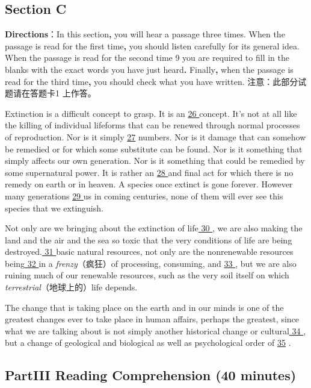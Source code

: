 \documentclass[UTF8,11pt]{ctexart}
\begin{document}
\subsection*{\textbf{Section C}}


\textbf{Directions}：In this section\textbf{,} you will hear a passage three times. When the passage is read for the first time\textbf{,} you should listen carefully for its general idea. When the passage is read for the second time 9 you are required to fill in the blanks with the exact words you have just heard\textbf{.} Finally\textbf{,} when the passage is read for the third time\textbf{,} you should check what you have written. 注意：此部分试题请在答题卡1 上作答。


Extinction is a difficult concept to grasp. It is an \uline{26 }concept. It’s not at all like the killing of individual lifeforms that can be renewed through normal processes of reproduction. Nor is it simply \uline{27} numbers. Nor is it damage that can somehow be remedied or for which some substitute can be found. Nor is it something that simply affects our own generation. Nor is it something that could be remedied by some supernatural power. It is rather an \uline{28 }and final act for which there is no remedy on earth or in heaven. A species once extinct is gone forever. However many generations \uline{29 }us in coming centuries, none of them will ever see this species that we extinguish.


Not only are we bringing about the extinction of life\uline{ 30 }, we are also making the land and the air and the sea so toxic that the very conditions of life are being destroyed.\uline{ 31 }basic natural resources, not only are the nonrenewable resources being\uline{ 32 }in a\textit{ frenzy}（疯狂）of processing, consuming, and \uline{33 }, but we are also ruining much of our renewable resources, such as the very soil itself on which\textit{ terrestrial}（地球上的）life depends.


The change that is taking place on the earth and in our minds is one of the greatest changes ever to take place in human affairs, perhaps the greatest, since what we are talking about is not simply another historical change or cultural\uline{ 34 }, but a change of geological and biological as well as psychological order of \uline{35} .


\subsection*{\textbf{Part}III \textbf{Reading Comprehension} \textbf{(40 minutes)}}
\end{document}
